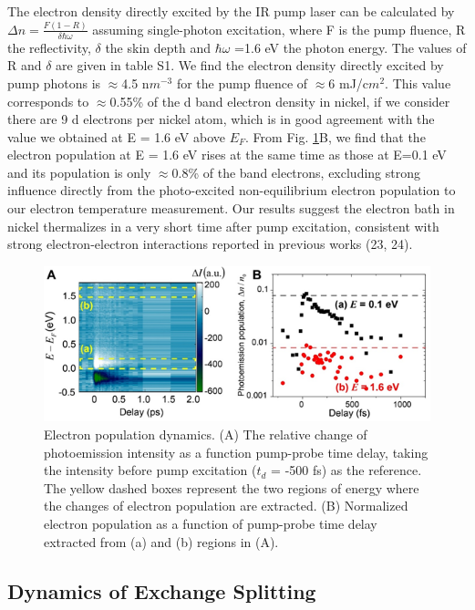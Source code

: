 The electron density directly excited by the IR pump laser can be calculated by $\Delta n=\frac{F(1-R)}{\delta\hbar\omega}$ assuming single-photon excitation, where F is the pump fluence, R the reflectivity, $\delta$ the skin depth and $\hbar\omega$ =1.6 eV the photon energy. The values of R and $\delta$ are given in table S1. We find the electron density directly excited by pump photons is $\approx$4.5 n$m^{-3}$ for the pump fluence of $\approx$6 mJ/c$m^2$. This value corresponds to $\approx$0.55\% of the d band electron density in nickel, if we consider there are 9 d electrons per nickel atom, which is in good agreement with the value we obtained at E = 1.6 eV above $E_F$. From Fig. \ref{fig: NiSIfig3}B, we find that the electron population at E = 1.6 eV rises at the same time as those at E=0.1 eV and its population is only $\approx$0.8\% of the band electrons, excluding strong influence directly from the photo-excited non-equilibrium electron population to our electron temperature measurement. Our results suggest the electron bath in nickel thermalizes in a very short time after pump excitation, consistent with strong electron-electron interactions reported in previous works (23, 24).

\begin{figure}[htbp]
	\begin{center}
		\includegraphics[width=150mm]{figs/NiFigS3}
	\end{center}
	\caption{Electron population dynamics. (A) The relative change of photoemission intensity as a function pump-probe time delay, taking the intensity before pump excitation ($t_d$ = -500 fs) as the reference. The yellow dashed boxes represent the two regions of energy where the changes of electron population are extracted. (B) Normalized electron population as a function of pump-probe time delay extracted from (a) and (b) regions in (A).}
	\label{fig: NiSIfig3}
\end{figure}

\subsection{Dynamics of Exchange Splitting}


